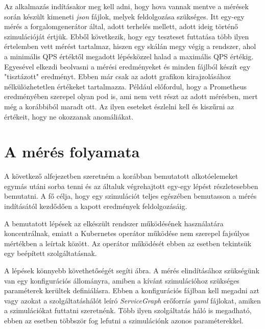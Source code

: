 %

Az alkalmazás indításakor meg kell adni, hogy hova vannak mentve a mérések során készült kimeneti \textit{json} fájlok, melyek feldolgozása szükséges.
Itt egy-egy mérés a forgalomgenerátor által, adott terhelés mellett, adott ideig történő szimulációját értjük.
Ebből következik, hogy egy teszteset futtatása több ilyen értelemben vett mérést tartalmaz, hiszen egy skálán megy végig a rendszer, ahol a minimális QPS értéktől megadott lépésközzel halad a maximális QPS értékig. 
Egyesével elkezdi beolvasni a mérési eredményeket és minden fájlból készít egy "tisztázott" eredményt.
Ebben már csak az adott grafikon kirajzolásához nélkülözhetetlen értékeket tartalmazza.
Például előfordul, hogy a Prometheus eredményében szerepel olyan pod is, ami nem vett részt az adott mérésben, mert még a korábbiból maradt ott.
Az ilyen eseteket észlelni kell és kiszűrni az értékeit, hogy ne okozzanak anomáliákat. 

\section{A mérés folyamata}
\label{sec:measure_steps}

A következő alfejezetben szeretném a korábban bemutatott alkotóelemeket egymás utáni sorba tenni és az általuk végrehajtott egy-egy lépést részletesebben bemutatni.
A fő célja, hogy egy szimulációt teljes egészében bemutasson a mérés indításától kezdődően a kapott eredmények feldolgozásáig.

A bemutatott lépések az elkészült rendszer működésének használatára koncentrálnak, emiatt a Kubernetes operátor működése nem szerepel fajsúlyos mértékben a leírtak között.
Az operátor működését ebben az esetben tekintsük egy beépített szolgáltatásnak.

A lépések könnyebb követhetőségét segíti  ábra.
A mérés elindításához szükségünk van egy konfigurációs állományra, amiben a kívánt szimulációhoz szükséges paraméterek kerültek definiálásra.
Ebben a konfigurációs fájlban kell megadni azt vagy azokat a szolgáltatáshálót leíró \textit{ServiceGraph} erőforrás \textit{yaml} fájlokat, amiken a szimulációkat futtatni szeretnénk.
Több ilyen szolgáltatás háló is megadható, ebben az esetben többször fog lefutni a szimulációnk azonos paraméterekkel.

